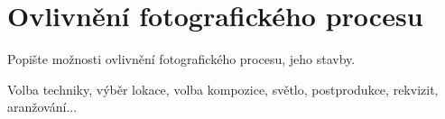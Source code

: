 \section{Ovlivnění fotografického procesu}
Popište možnosti ovlivnění fotografického procesu, jeho stavby.

Volba techniky, výběr lokace, volba kompozice, světlo, postprodukce, rekvizit, aranžování...